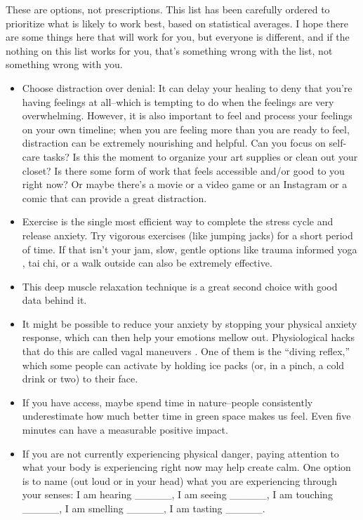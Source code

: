 \documentclass[12pt,letterpaper]{book}
\begin{document}
These are options, not prescriptions. This list has been carefully ordered to prioritize what is likely to work best, based on statistical averages. I hope there are some things here that will work for you, but everyone is different, and if the nothing on this list works for you, that's something wrong with the list, not something wrong with you.
\begin{itemize}
    \item Choose distraction over denial: It can delay your healing to deny that you're having feelings at all–which is tempting to do when the feelings are very overwhelming. However, it is also important to feel and process your feelings on your own timeline; when you are feeling more than you are ready to feel, distraction can be extremely nourishing and helpful. Can you focus on self-care tasks? Is this the moment to organize your art supplies or clean out your closet? Is there some form of work that feels accessible and/or good to you right now? Or maybe there's a movie or a video game or an Instagram or a comic that can provide a great distraction.
    \item Exercise is the single most efficient way to complete the stress cycle and release anxiety. Try vigorous exercises (like jumping jacks) for a short period of time. If that isn't your jam, slow, gentle options like trauma informed yoga \cite{gesselYoga}, tai chi, or a walk outside can also be extremely effective.
    \item This deep muscle relaxation technique \cite{michiganProgressive} is a great second choice with good data behind it.
    \item It might be possible to reduce your anxiety by stopping your physical anxiety response, which can then help your emotions mellow out. Physiological hacks that do this are called vagal maneuvers \cite{dilonardoValsalva}. One of them is the “diving reflex,” which some people can activate by holding ice packs (or, in a pinch, a cold drink or two) to their face.
    \item If you have access, maybe spend time in nature–people consistently underestimate how much better time in green space makes us feel. Even five minutes can have a measurable positive impact.
    \item If you are not currently experiencing physical danger, paying attention to what your body is experiencing right now may help create calm. One option is to name (out loud or in your head) what you are experiencing through your senses: I am hearing \_\_\_\_\_, I am seeing \_\_\_\_\_, I am touching \_\_\_\_\_, I am smelling \_\_\_\_\_, I am tasting \_\_\_\_\_.

\end{itemize}
\end{document}
